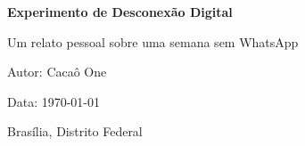 \begin{titlepage}
	\centering %
	\vspace*{2cm} %
	
	{\LARGE\sffamily\bfseries Experimento de Desconexão Digital\par} %
	\vspace{1.5cm} %
	
	{\large\sffamily Um relato pessoal sobre uma semana sem WhatsApp\par} %
	\vspace{2cm} %
	
	{\large\sffamily Autor: Cacaô One\par} %
	\vspace{1cm} %
	
	{\large\sffamily Data: \today\par} %
	\vspace{3cm} %
	

	
	{\large\sffamily Brasília, Distrito Federal \par} %
\end{titlepage}